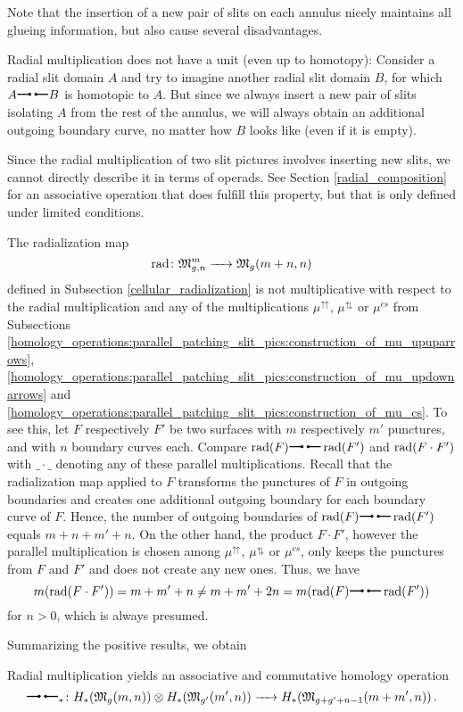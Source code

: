Note that the insertion of a new pair of slits on each annulus nicely maintains all glueing information, 
but also cause several disadvantages.

\begin{rem}
  Radial multiplication does not have a unit (even up to homotopy):
  Consider a radial slit domain $A$ and try to imagine another radial slit domain $B$, for which $A \radmult B$ is homotopic to $A$. 
  But since we always insert a new pair of slits isolating $A$ from the rest of the annulus, we will always obtain an additional outgoing boundary curve,
  no matter how $B$ looks like (even if it is empty).
\end{rem}

\begin{rem}
   Since the radial multiplication of two slit pictures involves inserting new slits, 
   we cannot directly describe it in terms of operads. 
   See Section \ref{radial_composition} for an associative operation that does fulfill this property, but that is only defined under limited conditions.
\end{rem}

\begin{rem}\label{radialization_not_mult}
   The radialization map 
   \[
      \operatorname{rad} \colon \mathfrak{M}^m_{g,n} \xrightarrow{\hspace{6pt}{}\hspace{6pt}} \mathfrak M_g(m + n, n)
   \]
   defined in Subsection \ref{cellular_radialization} is not multiplicative with respect to the radial multiplication and any of the multiplications $\mu^{\upuparrows}$, $\mu^{\updownarrows}$ or $\mu^{cs}$
   from Subsections \ref{homology_operations:parallel_patching_slit_pics:construction_of_mu_upuparrows}, 
   \ref{homology_operations:parallel_patching_slit_pics:construction_of_mu_updownarrows}
   and \ref{homology_operations:parallel_patching_slit_pics:construction_of_mu_cs}.
   To see this, let $F$ respectively $F'$ be two surfaces with $m$ respectively $m'$ punctures, and with $n$ boundary curves each.
   Compare $\radmap(F) \radmult \radmap(F')$ and $\operatorname{rad}(F \cdot F')$ with $\_\cdot\_$ denoting any of these parallel multiplications.
   Recall that the radialization map applied to $F$ transforms the punctures of $F$ in outgoing boundaries and creates one additional outgoing boundary for each boundary curve of $F$.
   Hence, the number of outgoing boundaries of $\radmap(F) \radmult \radmap(F')$ equals $m + n + m' + n$.
   On the other hand, the product $F \cdot F'$, however the parallel multiplication is chosen among $\mu^{\upuparrows}$, $\mu^{\updownarrows}$ or $\mu^{cs}$, 
   only keeps the punctures from $F$ and $F'$ and does not create any new ones.
   Thus, we have
   \[
    m(\radmap(F \cdot F')) = m + m' + n \neq m + m' + 2n = m(\radmap(F) \radmult \radmap(F'))
   \]
   for $n >  0$, which is always presumed.
\end{rem}

Summarizing the positive results, we obtain

\begin{cor}
  Radial multiplication yields an associative and commutative homology operation
  \[
     \radmult_* \colon H_*(\mathfrak M_g(m, n)) \otimes H_*(\mathfrak M_{g'}(m', n)) \to H_*(\mathfrak M_{g+g'+n - 1}(m + m', n))\,.
  \]
\end{cor}
